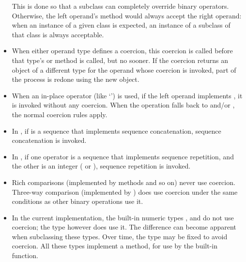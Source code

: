 \begin{itemize}
This is done so that a subclass can completely override binary operators.
Otherwise, the left operand's  method would always
accept the right operand: when an instance of a given class is expected,
an instance of a subclass of that class is always acceptable.

\item

When either operand type defines a coercion, this coercion is called
before that type's  or  method is
called, but no sooner.  If the coercion returns an object of a
different type for the operand whose coercion is invoked, part of the
process is redone using the new object.

\item

When an in-place operator (like `\code{+=}') is used, if the left
operand implements , it is invoked without any
coercion.  When the operation falls back to  and/or
, the normal coercion rules apply.

\item

In \code{+}, if  is a sequence that implements
sequence concatenation, sequence concatenation is invoked.

\item

In \code{*}, if one operator is a sequence that
implements sequence repetition, and the other is an integer
( or ), sequence repetition is invoked.

\item

Rich comparisons (implemented by methods  and so on)
never use coercion.  Three-way comparison (implemented by
) does use coercion under the same conditions as
other binary operations use it.

\item

In the current implementation, the built-in numeric types ,
 and  do not use coercion; the type
 however does use it.  The difference can become
apparent when subclassing these types.  Over time, the type
 may be fixed to avoid coercion.  All these types
implement a  method, for use by the built-in
 function.

\end{itemize}


